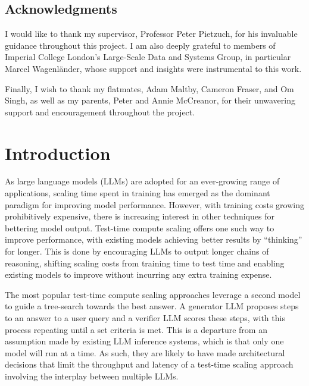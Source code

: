\documentclass[11pt,twoside]{report}
\begin{document}
\cleardoublepage
\section*{Acknowledgments}
I would like to thank my supervisor, Professor Peter Pietzuch, for his invaluable guidance throughout this project.
I am also deeply grateful to members of Imperial College London's Large-Scale Data and Systems Group, in particular Marcel Wagenländer, whose support and insights were instrumental to this work.

Finally, I wish to thank my flatmates, Adam Maltby, Cameron Fraser, and Om Singh, as well as my parents, Peter and Annie McCreanor, for their unwavering support and encouragement throughout the project.

\tableofcontents 


\setcounter{page}{1}
\fancyhead[LE,RO]{\slshape \rightmark}
\fancyhead[LO,RE]{\slshape \leftmark}

\chapter{Introduction} %

As large language models (LLMs) are adopted for an ever-growing range of applications, scaling time spent in training has emerged as the dominant paradigm for improving model performance.
However, with training costs growing prohibitively expensive, there is increasing interest in other techniques for bettering model output. 
Test-time compute scaling offers one such way to improve performance, with existing models achieving better results by ``thinking'' for longer.
This is done by encouraging LLMs to output longer chains of reasoning, shifting scaling costs from training time to test time and enabling existing models to improve without incurring any extra training expense.

The most popular test-time compute scaling approaches leverage a second model to guide a tree-search towards the best answer.
A generator LLM proposes steps to an answer to a user query and a verifier LLM scores these steps, with this process repeating until a set criteria is met. 
This is a departure from an assumption made by existing LLM inference systems, which is that only one model will run at a time.
As such, they are likely to have made architectural decisions that limit the throughput and latency of a test-time scaling approach involving the interplay between multiple LLMs.
\end{document}
